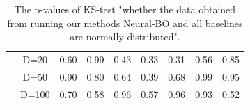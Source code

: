 \begin{table}[]
{\begin{tabular}{|cc|c|c|c|c|c|c|c|}
\multicolumn{1}{|c|}{}                                                                                  & D=20  & 0.60                                                         & 0.99                                                             & 0.43                                                      & 0.33                                                     & 0.31                                                     & 0.56          & 0.85        \\ \cline{2-9} 
\multicolumn{1}{|c|}{}                                                                                  & D=50  & 0.90                                                         & 0.80                                                             & 0.64                                                      & 0.39                                                     & 0.68                                                     & 0.99          & 0.95        \\ \cline{2-9} 
\multicolumn{1}{|c|}{}                                                                                  & D=100 & 0.70                                                         & 0.58                                                             & 0.96                                                      & 0.57                                                     & 0.96                                                     & 0.93          & 0.52        \\ \hline
\end{tabular}
}
\caption{The p-values of KS-test "whether the data obtained from running our methods Neural-BO and all baselines are normally distributed".}
\label{tab:ks_test}
\end{table}



